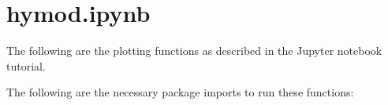 \documentclass[letterpaper,10pt,english]{book}
\begin{document}
\section{hymod.ipynb}
\label{\detokenize{A3_plotting_code:hymod-ipynb}}
\sphinxAtStartPar
The following are the plotting functions as described in the  Jupyter notebook tutorial.

\sphinxAtStartPar
The following are the necessary package imports to run these functions:

\begin{sphinxVerbatim}[commandchars=\\\{\}]
   
   
   

   
\end{sphinxVerbatim}
\end{document}
